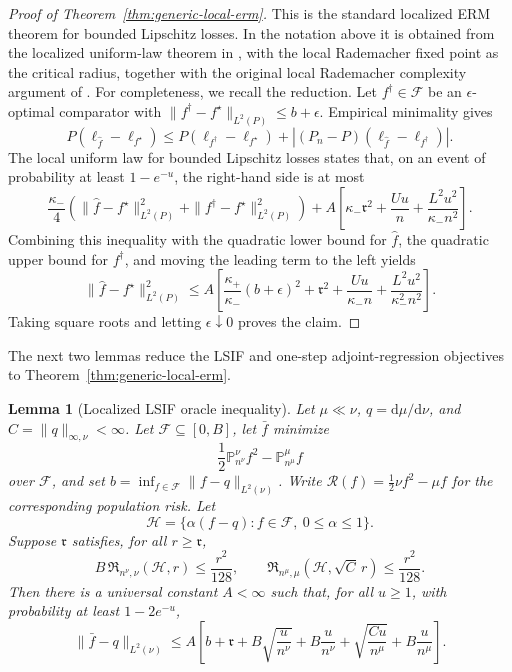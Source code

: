 \documentclass{article}
\newcommand{\sF}{\mathcal{F}}
\newcommand{\sH}{\mathcal{H}}
\newcommand{\1}{\mathbf{1}}
\newcommand{\dd}{\mathrm{d}}
\newcommand{\Risk}{\mathcal{R}}
\newcommand{\Emp}{\mathbb{P}}
\newcommand{\Rad}{\mathfrak{R}}
\newcommand{\crit}{\mathfrak{r}}
\theoremstyle{plain}
\newtheorem{lemma}[theorem]{Lemma}
\theoremstyle{definition}
\theoremstyle{remark}
\begin{document}
\begin{proof}[Proof of Theorem~\ref{thm:generic-local-erm}]
This is the standard localized ERM theorem for bounded Lipschitz losses.
In the notation above it is obtained from the localized uniform-law theorem in \citet[Chapter~14]{wainwright2019HighDimensionalStatistics}, with the local Rademacher fixed point as the critical radius, together with the original local Rademacher complexity argument of \citet{bartlettEtAl2005LocalRademacher}.
For completeness, we recall the reduction.
Let $f^\dagger\in\sF$ be an $\epsilon$-optimal comparator with $\|f^\dagger-f^\star\|_{L^2(P)}\le b+\epsilon$.
Empirical minimality gives
\[
    P(\ell_{\widehat f}-\ell_{f^\star})
    \le
    P(\ell_{f^\dagger}-\ell_{f^\star})
    +
    |(P_n-P)(\ell_{\widehat f}-\ell_{f^\dagger})|.
\]
The local uniform law for bounded Lipschitz losses states that, on an event of probability at least $1-e^{-u}$, the right-hand side is at most
\[
    \frac{\kappa_-}{4}
    \left(
        \|\widehat f-f^\star\|_{L^2(P)}^2
        +
        \|f^\dagger-f^\star\|_{L^2(P)}^2
    \right)
    +
    A\left[
        \kappa_-\crit^2
        +
        \frac{Uu}{n}
        +
        \frac{L^2u^2}{\kappa_- n^2}
    \right].
\]
Combining this inequality with the quadratic lower bound for $\widehat f$, the quadratic upper bound for $f^\dagger$, and moving the leading term to the left yields
\[
    \|\widehat f-f^\star\|_{L^2(P)}^2
    \le
    A\left[
        \frac{\kappa_+}{\kappa_-}(b+\epsilon)^2
        +\crit^2+\frac{Uu}{\kappa_- n}
        +\frac{L^2u^2}{\kappa_-^2 n^2}
    \right].
\]
Taking square roots and letting $\epsilon\downarrow0$ proves the claim.
\end{proof}

The next two lemmas reduce the LSIF and one-step adjoint-regression objectives to Theorem~\ref{thm:generic-local-erm}.

\begin{lemma}[Localized LSIF oracle inequality]
\label{lem:localized-lsif}
Let $\mu\ll\nu$, $q=\dd\mu/\dd\nu$, and $C=\|q\|_{\infty,\nu}<\infty$.
Let $\sF\subseteq[0,B]$, let $\bar f$ minimize
\[
    \frac12\Emp_{n^\nu}^{\nu} f^2-\Emp_{n^\mu}^{\mu} f
\]
over $\sF$, and set $b=\inf_{f\in\sF}\|f-q\|_{L^2(\nu)}$.
Write $\Risk(f)=\frac12\nu f^2-\mu f$ for the corresponding population risk.
Let
\[
    \sH
    =
    \{\alpha(f-q): f\in\sF,\ 0\le\alpha\le1\}.
\]
Suppose $\crit$ satisfies, for all $r\ge\crit$,
\[
    B\,\Rad_{n^\nu,\nu}(\sH,r)\le \frac{r^2}{128},
    \qquad
    \Rad_{n^\mu,\mu}(\sH,\sqrt C\,r)\le \frac{r^2}{128}.
\]
Then there is a universal constant $A<\infty$ such that, for all $u\ge1$, with probability at least $1-2e^{-u}$,
\[
    \|\bar f-q\|_{L^2(\nu)}
    \le
    A\left[
        b+\crit
        +B\sqrt{\frac{u}{n^\nu}}
        +B\frac{u}{n^\nu}
        +\sqrt{\frac{Cu}{n^\mu}}
        +B\frac{u}{n^\mu}
    \right].
\]
\end{lemma}
\end{document}

